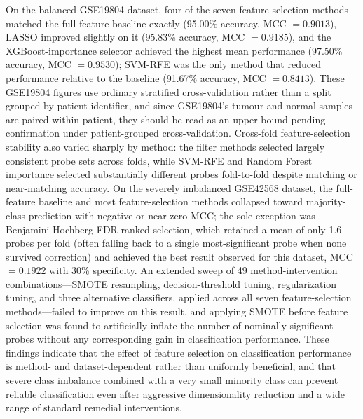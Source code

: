 On the balanced GSE19804 dataset, four of the seven feature-selection methods matched the full-feature baseline exactly (95.00\% accuracy, MCC $=0.9013$), LASSO improved slightly on it (95.83\% accuracy, MCC $=0.9185$), and the XGBoost-importance selector achieved the highest mean performance (97.50\% accuracy, MCC $=0.9530$); SVM-RFE was the only method that reduced performance relative to the baseline (91.67\% accuracy, MCC $=0.8413$). These GSE19804 figures use ordinary stratified cross-validation rather than a split grouped by patient identifier, and since GSE19804's tumour and normal samples are paired within patient, they should be read as an upper bound pending confirmation under patient-grouped cross-validation. Cross-fold feature-selection stability also varied sharply by method: the filter methods selected largely consistent probe sets across folds, while SVM-RFE and Random Forest importance selected substantially different probes fold-to-fold despite matching or near-matching accuracy. On the severely imbalanced GSE42568 dataset, the full-feature baseline and most feature-selection methods collapsed toward majority-class prediction with negative or near-zero MCC; the sole exception was Benjamini-Hochberg FDR-ranked selection, which retained a mean of only 1.6 probes per fold (often falling back to a single most-significant probe when none survived correction) and achieved the best result observed for this dataset, MCC $=0.1922$ with 30\% specificity. An extended sweep of 49 method-intervention combinations---SMOTE resampling, decision-threshold tuning, regularization tuning, and three alternative classifiers, applied across all seven feature-selection methods---failed to improve on this result, and applying SMOTE before feature selection was found to artificially inflate the number of nominally significant probes without any corresponding gain in classification performance. These findings indicate that the effect of feature selection on classification performance is method- and dataset-dependent rather than uniformly beneficial, and that severe class imbalance combined with a very small minority class can prevent reliable classification even after aggressive dimensionality reduction and a wide range of standard remedial interventions.